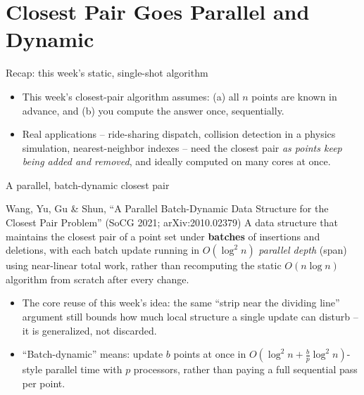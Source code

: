 \documentclass[11pt,aspectratio=169]{beamer}
\begin{document}
\section{Closest Pair Goes Parallel and Dynamic}

\begin{frame}{Recap: this week's static, single-shot algorithm}
  \begin{itemize}
    \item This week's closest-pair algorithm assumes: (a) all $n$ points are known in
    advance, and (b) you compute the answer once, sequentially.
    \item Real applications -- ride-sharing dispatch, collision detection in a physics
    simulation, nearest-neighbor indexes -- need the closest pair \emph{as points keep
    being added and removed}, and ideally computed on many cores at once.
  \end{itemize}
\end{frame}

\begin{frame}{A parallel, batch-dynamic closest pair}
  \begin{block}{Wang, Yu, Gu \& Shun, ``A Parallel Batch-Dynamic Data Structure for the
  Closest Pair Problem'' (SoCG 2021; arXiv:2010.02379)}
    A data structure that maintains the closest pair of a point set under
    \textbf{batches} of insertions and deletions, with each batch update running in
    $O(\log^2 n)$ \emph{parallel depth} (span) using near-linear total work, rather than
    recomputing the static $O(n\log n)$ algorithm from scratch after every change.
  \end{block}
  \begin{itemize}
    \item The core reuse of this week's idea: the same ``strip near the dividing line''
    argument still bounds how much local structure a single update can disturb -- it
    is generalized, not discarded.
    \item ``Batch-dynamic'' means: update $b$ points at once in
    $O\!\left(\log^2 n + \frac{b}{p}\log^2 n\right)$-style parallel time with $p$
    processors, rather than paying a full sequential pass per point.
  \end{itemize}
\end{frame}

\end{document}
